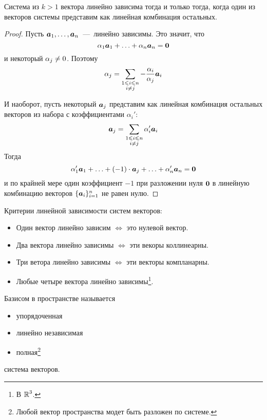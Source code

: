 \documentclass[a4paper,12pt]{article}
\begin{document}
  \begin{theorem}
    Система из $k > 1$ вектора линейно зависима тогда и только тогда, когда один из векторов системы представим как линейная комбинация остальных.
  \end{theorem}
  
  \begin{proof}
    Пусть $\boldsymbol a_1, \ldots, \boldsymbol a_n$~---~линейно зависимы.
    Это значит, что
    \[
      \alpha_1 \boldsymbol a_1 + \ldots + \alpha_n \boldsymbol a_n = \boldsymbol 0
    \]
    и некоторый $\alpha_j \hm{\not=} 0$.
    Поэтому
    \[
      \alpha_j = \sum\limits_{\substack{1 \leqslant i \leqslant n\\i \not= j}} -\frac{\alpha_i}{\alpha_j} \boldsymbol a_i
    \]
    
    И наоборот, пусть некоторый $\boldsymbol a_j$ представим как линейная комбинация остальных векторов из набора с коэффициентами $\alpha_i'$:
    \[
      \boldsymbol a_j = \sum\limits_{\substack{1 \leqslant i \leqslant n\\i \not= j}} \alpha_i' \boldsymbol a_i
    \]
    Тогда
    \[
      \alpha_1' \boldsymbol a_1 + \ldots + (-1) \cdot \boldsymbol a_j + \ldots + \alpha_n' \boldsymbol a_n = \boldsymbol 0
    \]
    и по крайней мере один коэффициент $-1$ при разложении нуля $\boldsymbol 0$ в линейную комбинацию векторов $\{\boldsymbol a_i\}_{i=1}^n$ не равен нулю.
  \end{proof}
  
  \begin{theorem}\label{theo:linear-dependence-criteria}
    Критерии линейной зависимости систем векторов:
    \begin{itemize}
      \item Один вектор линейно зависим $\Leftrightarrow$ это нулевой вектор.
      \item Два вектора линейно зависимы $\Leftrightarrow$ эти векоры коллинеарны.
      \item Три ветора линейно зависимы $\Leftrightarrow$ эти векторы компланарны.
      \item Любые четыре вектора линейно зависимы\footnote{В $\operatorname{\mathbb R}^3$.}.
    \end{itemize}
  \end{theorem}
  
  \begin{definition}[Базис]
    Базисом в пространстве называется
    \begin{itemize}
      \item упорядоченная
      \item линейно независимая
      \item полная\footnote{Любой вектор пространства модет быть разложен по системе.}
    \end{itemize}
    система векторов.
  \end{definition}
  
\end{document}

